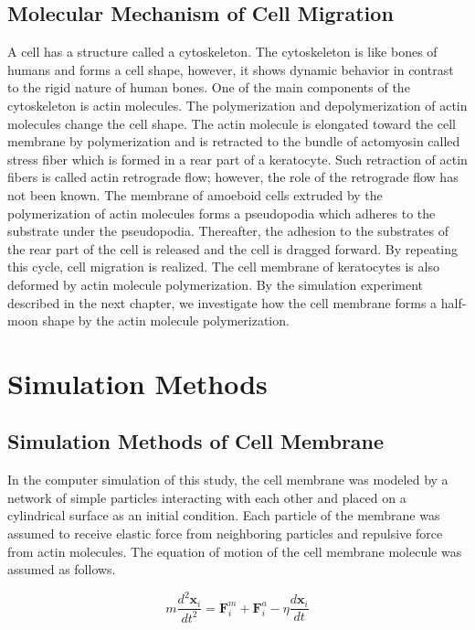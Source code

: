 \documentclass[a4paper,12pt, oneside]{book}
\begin{document}
\section{Molecular Mechanism of Cell Migration}
A cell has a structure called a cytoskeleton.
The cytoskeleton is like bones of humans and forms a cell shape, however, it shows dynamic behavior  in contrast to the rigid nature of human bones.
One of the  main components of the cytoskeleton is actin molecules.
The polymerization and depolymerization of actin molecules change the cell shape.
The actin molecule is elongated toward the cell membrane by polymerization and is retracted to the bundle of actomyosin called stress fiber which is formed in a rear part of a keratocyte.
Such retraction of actin fibers is called actin retrograde flow; however, the role of the retrograde flow has not been known.
The membrane of amoeboid cells extruded by the polymerization of actin molecules forms a pseudopodia which  adheres to the substrate under the pseudopodia.
Thereafter, the adhesion to the substrates of the rear part of the cell is released and the cell is dragged forward.
By repeating this cycle, cell migration is realized.
The cell membrane of keratocytes is also deformed by actin molecule polymerization.
By the simulation experiment described in the next chapter, we investigate how the cell membrane forms a half-moon shape by the actin molecule polymerization. 
\chapter{Simulation Methods}
\section{Simulation Methods of Cell Membrane}
In the computer simulation of this study, the cell membrane was modeled by a network of simple particles interacting with each other and placed on a cylindrical surface as an initial condition.
Each particle of the membrane was assumed to receive elastic force from neighboring particles and repulsive force from actin molecules.
The equation of motion of the cell membrane molecule was assumed as follows.

\begin{equation}
m\frac{d^2\bm{x}_i}{dt^2} = \bm{F}^m_i +  \bm{F}^a_i - \eta \frac{d\bm{x}_i}{dt}
\end{equation}
\end{document}
